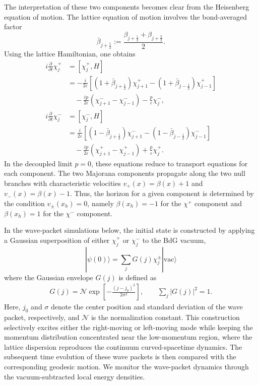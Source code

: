 \documentclass[reprint,amsmath,amssymb,aps,prb,showkeys]{revtex4-2}
\begin{document}
The interpretation of these two components becomes clear from the Heisenberg equation of motion.
The lattice equation of motion involves the bond-averaged factor
\begin{equation}
    \bar{\beta}_{j+\frac{1}{2}}
    :=
    \frac{\beta_{j+\frac{1}{2}}+\beta_{j+\frac{3}{2}}}{2}.
\end{equation}
Using the lattice Hamiltonian, one obtains
\begin{align}
i\frac{\partial}{\partial t}\chi_j^+
&=
[\chi_j^+,H]
\nonumber\\
&=
-\frac{i}{2\varepsilon}
\left[
(1+\bar{\beta}_{j+\frac{1}{2}})\chi_{j+1}^+
-
(1+\bar{\beta}_{j-\frac{1}{2}})\chi_{j-1}^+
\right]
\nonumber\\
&\quad
-
\frac{i p}{2\varepsilon}
\left(
\chi_{j+1}^-
-
\chi_{j-1}^-
\right)
-
\frac{p}{\varepsilon}\chi_j^-,
\nonumber\\
i\frac{\partial}{\partial t}\chi_j^-
&=
[\chi_j^-,H]
\nonumber\\
&=
\frac{i}{2\varepsilon}
\left[
(1-\bar{\beta}_{j+\frac{1}{2}})\chi_{j+1}^-
-
(1-\bar{\beta}_{j-\frac{1}{2}})\chi_{j-1}^-
\right]
\nonumber\\
&\quad
-
\frac{i p}{2\varepsilon}
\left(
\chi_{j+1}^+
-
\chi_{j-1}^+
\right)
+
\frac{p}{\varepsilon}\chi_j^+ .
\label{eq:chi_eom_lattice}
\end{align}
In the decoupled limit $p=0$, these equations reduce to transport equations for each component. The two Majorana components propagate along the two null branches with characteristic velocities
$v_+(x)=\beta(x)+1$ and $v_-(x)=\beta(x)-1$. Thus, the horizon for a given component is determined by the condition $v_\pm(x_h)=0$, namely $\beta(x_h)=-1$ for the $\chi^+$ component and $\beta(x_h)=1$ for the $\chi^-$ component.


In the wave-packet simulations below, the initial state is constructed by applying a Gaussian superposition of either $\chi_j^+$ or $\chi_j^-$ to the BdG vacuum,
\begin{equation}
|\psi(0)\rangle
=
\sum_j G(j)\chi_j^\pm |\mathrm{vac}\rangle
\label{eq:initial_state_chi}
\end{equation}
where the Gaussian envelope $G(j)$ is defined as
\begin{align}
G(j) = \mathcal{N}
\exp\!\left[-\frac{(j - j_{0})^{2}}{2\sigma^{2}}\right],
\qquad
\sum_{j}|G(j)|^2=1.
\label{eq:gaussian}
\end{align}
Here, $j_{0}$ and $\sigma$ denote the center position and standard deviation of the wave packet, respectively, and $\mathcal{N}$ is the normalization constant. This construction selectively excites either the right-moving or left-moving mode while keeping the momentum distribution concentrated near the low-momentum region, where the lattice dispersion reproduces the continuum curved-spacetime dynamics. The subsequent time evolution of these wave packets is then compared with the corresponding geodesic motion.
We monitor the wave-packet dynamics through the vacuum-subtracted local energy densities.
\end{document}

